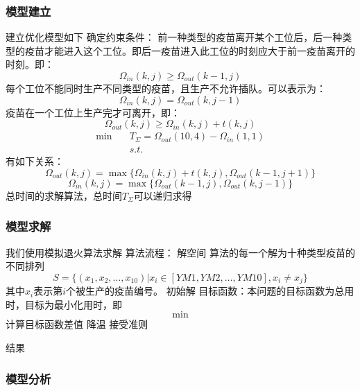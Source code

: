 \documentclass[UTF8]{ctexart}
\begin{document}
	\subsubsection{模型建立}
	建立优化模型如下
	确定约束条件：
	前一种类型的疫苗离开某个工位后，后一种类型的疫苗才能进入这个工位。即后一疫苗进入此工位的时刻应大于前一疫苗离开的时刻。即：
	\begin{equation}
		\Omega_{in}(k,j)\geqslant\Omega_{out}(k-1,j)
	\end{equation}
	每个工位不能同时生产不同类型的疫苗，且生产不允许插队。可以表示为：
	\begin{equation}
		\Omega_{in}(k,j)=\Omega_{out}(k,j-1)
	\end{equation}
	疫苗在一个工位上生产完才可离开，即：
	\begin{equation}
		\Omega_{out}(k,j)\geqslant\Omega_{in}(k,j)+t(k,j)
	\end{equation}
	\begin{equation}
		\begin{split}
		\min \quad&T_{\Sigma}=\Omega_{out}(10,4)-\Omega_{in}(1,1)\\
		&s.t. 
		\end{split}
	\end{equation}
	有如下关系：
	\begin{equation}
		\Omega_{out}(k,j)=\max\{\Omega_{in}(k,j)+t(k,j),\Omega_{out}(k-1,j+1)\}
	\end{equation}
	\begin{equation}
		\Omega_{in}(k,j)=\max\{\Omega_{out}(k-1,j),\Omega_{out}(k,j-1)\}
	\end{equation}
	总时间的求解算法，总时间$T_{\Sigma}$可以递归求得
	\subsubsection{模型求解}
	我们使用模拟退火算法求解
	算法流程：
	解空间
	算法的每一个解为十种类型疫苗的不同排列
	\begin{equation}
		S=\{(x_1,x_2,\dots,x_{10})|x_{i}\in[YM1,YM2,\dots,YM10],x_{i}\neq x_{j}\}
	\end{equation}
	其中$x_{i}$表示第$i$个被生产的疫苗编号。
	初始解
	目标函数：本问题的目标函数为总用时，目标为最小化用时，即
	\begin{equation}
		\min
	\end{equation}
	计算目标函数差值
	降温
	接受准则
	\par 结果
	\subsubsection{模型分析}
	
\end{document}
